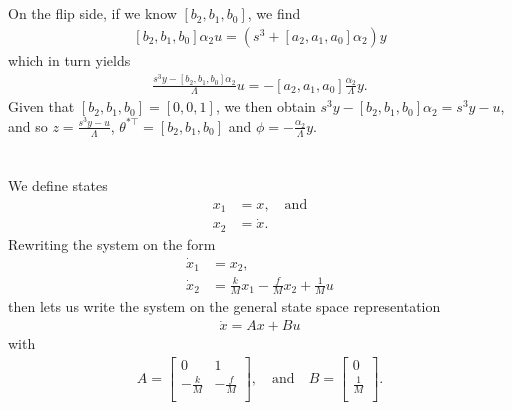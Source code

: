 \documentclass[]{article}
\begin{document}
\subsection{}
On the flip side, if we know $[b_2, b_1, b_0]$, we find
\begin{equation}\begin{aligned}
\left[b_2, b_1, b_0\right] \alpha_2 u = (s^3 + [a_2, a_1, a_0] \alpha_2)y
\end{aligned}\end{equation}
which in turn yields
\begin{equation}\begin{aligned}
\frac{s^3y - [b_2, b_1, b_0] \alpha_2}{\Lambda} u = -[a_2, a_1, a_0] \frac{\alpha_2}{\Lambda} y.
\end{aligned}\end{equation}
Given that $[b_2, b_1, b_0] = [0, 0, 1]$, we then obtain $s^3y - [b_2, b_1, b_0] \alpha_2 = s^3y - u$, and so $z = \frac{s^3y - u}{\Lambda}$, $\theta^{*\top} = [b_2, b_1, b_0]$ and $\phi = -\frac{\alpha_2}{\Lambda}y$.

\section{}
\subsection{}
We define states
\begin{equation}\begin{aligned}
x_1 &= x, \quad \text{and} \\
x_2 &= \dot x.
\end{aligned}\end{equation}
Rewriting the system on the form
\begin{equation}\begin{aligned}
\dot x_1 &= x_2,\\
\dot x_2 &= \frac{k}{M}x_1 - \frac{f}{M}x_2 + \frac{1}{M}u
\end{aligned}\end{equation}
then lets us write the system on the general state space representation
\begin{equation}\begin{aligned}
\dot x = Ax + Bu
\end{aligned}\end{equation}
with \begin{equation}\begin{aligned}
A = \begin{bmatrix}
0 & 1 \\
-\frac{k}{M} & -\frac{f}{M} \\
\end{bmatrix},\quad \text{and} \quad
B = \begin{bmatrix}
0\\
\frac{1}{M}\\
\end{bmatrix}.
\end{aligned}\end{equation}
\end{document}
